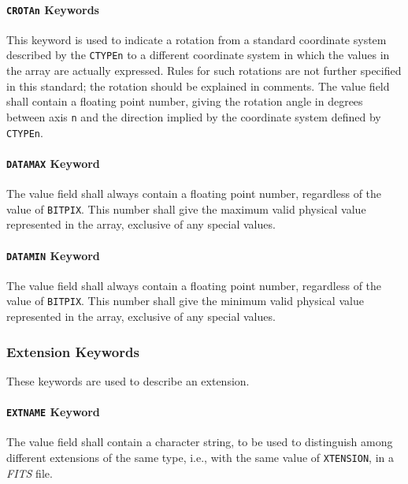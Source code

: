    \paragraph{{\tt CROTAn} Keywords}
 This keyword is used to indicate a rotation from a
 standard coordinate system
 described by the {\tt CTYPEn} to
 a different coordinate system in which the values in the
 array are actually expressed. Rules for such rotations are
 not further specified in this standard; the rotation should
 be explained in comments. The value field shall contain
 a floating point number, giving the rotation angle
 in degrees between
 axis {\tt n} and the direction implied by the coordinate system
 defined by {\tt CTYPEn}.
  
   \paragraph{{\tt DATAMAX} Keyword}
 The value field shall always contain a floating point
 number, regardless of the value of {\tt BITPIX}. This
 number
 shall give the maximum valid physical value 
 represented in the array, exclusive of any 
 special values.
  
   \paragraph{{\tt DATAMIN} Keyword}
 The value field shall always contain a floating point
 number, regardless of the value of {\tt BITPIX}. This
number
 shall give the minimum valid physical value represented
 in the array, exclusive of any special values.
  
\subsubsection{Extension Keywords}
   These keywords are used to describe an extension.    
  
  
   \paragraph{{\tt EXTNAME} Keyword}
 The value field shall contain a character 
 string, to be
 used to distinguish
 among different extensions of the same 
 type, i.e., with the same value of {\tt XTENSION}, 
 in a {\em FITS\/} file.
  
